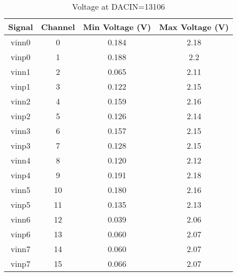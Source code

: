 \begin{table}[h!]
	\centering
	\caption{Voltage at DACIN=13106}
	\begin{tabular}{ |c|c|c|c| }
		\hline
		\textbf{Signal} & \textbf{Channel} & \textbf{Min Voltage (V)} & \textbf{Max Voltage (V)} \\
		\hline
		vinn0           & 0                & 0.184                    & 2.18                     \\
		\hline
		vinp0           & 1                & 0.188                    & 2.2                      \\
		\hline
		vinn1           & 2                & 0.065                    & 2.11                     \\
		\hline
		vinp1           & 3                & 0.122                    & 2.15                     \\
		\hline
		vinn2           & 4                & 0.159                    & 2.16                     \\
		\hline
		vinp2           & 5                & 0.126                    & 2.14                     \\
		\hline
		vinn3           & 6                & 0.157                    & 2.15                     \\
		\hline
		vinp3           & 7                & 0.128                    & 2.15                     \\
		\hline
		vinn4           & 8                & 0.120                    & 2.12                     \\
		\hline
		vinp4           & 9                & 0.191                    & 2.18                     \\
		\hline
		vinn5           & 10               & 0.180                    & 2.16                     \\
		\hline
		vinp5           & 11               & 0.135                    & 2.13                     \\
		\hline
		vinn6           & 12               & 0.039                    & 2.06                     \\
		\hline
		vinp6           & 13               & 0.060                    & 2.07                     \\
		\hline
		vinn7           & 14               & 0.060                    & 2.07                     \\
		\hline
		vinp7           & 15               & 0.066                    & 2.07                     \\
		\hline
	\end{tabular}
\end{table}

